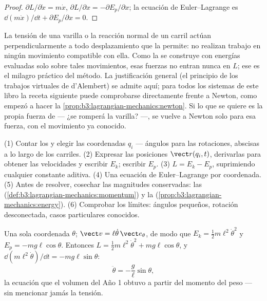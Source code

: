 \begin{proof}
$\partial L/\partial\dot x = m\dot x$, $\partial L/\partial x =
-\partial E_p/\partial x$; la ecuación de Euler--Lagrange es
$\dd(m\dot x)/\dd t + \partial E_p/\partial x = 0$.
\end{proof}

\begin{remark}\label{rem:b3:lagrangian-mechanics:constraints}
La tensión de una varilla o la reacción normal de un carril actúan
perpendicularmente a todo desplazamiento que la  permite: no
realizan trabajo en ningún movimiento compatible con ella. Como la  se
construye con energías evaluadas solo sobre tales movimientos, esas fuerzas
no entran nunca en $L$; ese es el milagro práctico del método. La
justificación general (el principio de los trabajos virtuales de d'Alembert)
se admite aquí; para todos los sistemas de este libro la receta siguiente
puede comprobarse directamente frente a Newton, como empezó a hacer la
\cref{prop:b3:lagrangian-mechanics:newton}. Si lo que se quiere es la propia
fuerza de  --- ¿se romperá la varilla? ---, se vuelve a Newton solo
para esa fuerza, con el movimiento ya conocido.
\end{remark}

\begin{method}\label{met:b3:lagrangian-mechanics:recipe}
(1) Contar los  y elegir las coordenadas $q_i$ ---
ángulos para las rotaciones, abscisas a lo largo de los carriles.
(2) Expresar las posiciones $\vect r(q_i, t)$, derivarlas para obtener las
velocidades y escribir $E_k$; escribir $E_p$. (3) $L = E_k - E_p$,
suprimiendo cualquier constante aditiva. (4) Una ecuación de Euler--Lagrange
por coordenada. (5) Antes de resolver, cosechar las magnitudes conservadas:
las  (\cref{def:b3:lagrangian-mechanics:momentum}) y la
 (\cref{prop:b3:lagrangian-mechanics:energy}). (6) Comprobar
los límites: ángulos pequeños, rotación desconectada, casos particulares
conocidos.
\end{method}

\begin{example}\label{ex:b3:lagrangian-mechanics:pendulum}
Una sola coordenada $\theta$; $\vect v = \ell\dot\theta\,\vect e_\theta$, de
modo que $E_k = \tfrac12 m\ell^2\dot\theta^2$ y $E_p = -mg\ell\cos\theta$.
Entonces $L = \tfrac12 m\ell^2\dot\theta^2 + mg\ell\cos\theta$, y
$\dd(m\ell^2\dot\theta)/\dd t = -mg\ell\sin\theta$:
\[
\ddot\theta = -\frac{g}{\ell}\sin\theta ,
\]
la ecuación que el volumen del Año 1 obtuvo a partir del momento del peso
--- sin mencionar jamás la tensión.
\end{example}

